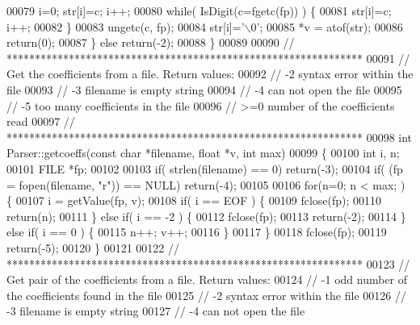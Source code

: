 \begin{DoxyCode}
00079         i=0; str[i]=c; i++;
00080         \textcolor{keywordflow}{while}( IsDigit(c=fgetc(fp)) ) \{
00081             str[i]=c; i++;
00082         \}
00083         ungetc(c, fp);
00084         str[i]=\textcolor{charliteral}{'\(\backslash\)0'};
00085         *v = atof(str);
00086         \textcolor{keywordflow}{return}(0);
00087     \} \textcolor{keywordflow}{else} \textcolor{keywordflow}{return}(-2);
00088 \}
00089 
00090 \textcolor{comment}{// ***************************************************************}
00091 \textcolor{comment}{// Get the coefficients from a file. Return values:}
00092 \textcolor{comment}{//  -2  syntax error within the file}
00093 \textcolor{comment}{//  -3  filename is empty string}
00094 \textcolor{comment}{//  -4  can not open the file}
00095 \textcolor{comment}{//  -5  too many coefficients in the file}
00096 \textcolor{comment}{//  >=0     number of the coefficients read}
00097 \textcolor{comment}{// ***************************************************************}
00098 \textcolor{keywordtype}{int} Parser::getcoeffs(\textcolor{keyword}{const} \textcolor{keywordtype}{char} *filename, \textcolor{keywordtype}{float} *v, \textcolor{keywordtype}{int} max)
00099 \{
00100     \textcolor{keywordtype}{int} i, n;
00101     FILE *fp;
00102 
00103     \textcolor{keywordflow}{if}( strlen(filename) == 0) \textcolor{keywordflow}{return}(-3);
00104     \textcolor{keywordflow}{if}( (fp = fopen(filename, \textcolor{stringliteral}{"r"})) == NULL) \textcolor{keywordflow}{return}(-4);
00105 
00106     \textcolor{keywordflow}{for}(n=0; n < max; ) \{
00107         i = getValue(fp, v);
00108         \textcolor{keywordflow}{if}( i == EOF ) \{
00109             fclose(fp);
00110             \textcolor{keywordflow}{return}(n);
00111         \} \textcolor{keywordflow}{else} \textcolor{keywordflow}{if}( i ==  -2 ) \{
00112             fclose(fp);
00113             \textcolor{keywordflow}{return}(-2);
00114         \} \textcolor{keywordflow}{else} \textcolor{keywordflow}{if}( i == 0 ) \{
00115             n++; v++;
00116         \}
00117     \}
00118     fclose(fp);
00119     \textcolor{keywordflow}{return}(-5);
00120 \}
00121 
00122 \textcolor{comment}{// ***************************************************************}
00123 \textcolor{comment}{// Get pair of the coefficients from a file. Return values:}
00124 \textcolor{comment}{//  -1  odd number of the coefficients found in the file}
00125 \textcolor{comment}{//  -2  syntax error within the file}
00126 \textcolor{comment}{//  -3  filename is empty string}
00127 \textcolor{comment}{//  -4  can not open the file}

\end{DoxyCode}
